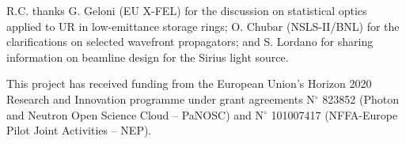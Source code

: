 \documentclass{iucr}              %
\begin{document}


R.C. thanks G. Geloni (EU X-FEL) for the discussion on statistical optics applied to UR in low-emittance storage rings; O. Chubar (NSLS-II/BNL) for the clarifications on selected wavefront propagators; and S. Lordano for sharing information on beamline design for the Sirius light source.


This project has received funding from the European Union’s Horizon 2020 Research and Innovation programme under grant agreements N$^{\circ}$ 823852 (Photon and Neutron Open Science Cloud -- PaNOSC) and N$^{\circ}$ 101007417 (NFFA-Europe Pilot Joint Activities -- NEP).


\end{document}
